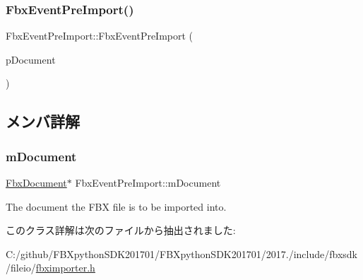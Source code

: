 \subsubsection{\texorpdfstring{Fbx\+Event\+Pre\+Import()}{FbxEventPreImport()}}
{\footnotesize\ttfamily Fbx\+Event\+Pre\+Import\+::\+Fbx\+Event\+Pre\+Import (\begin{DoxyParamCaption}\item[{\hyperlink{class_fbx_document}{Fbx\+Document} $\ast$}]{p\+Document }\end{DoxyParamCaption})}



\subsection{メンバ詳解}
\mbox{\label{class_fbx_event_pre_import_a89b454dc61f00b64cc8a8f951e5e1003}} 
\subsubsection{\texorpdfstring{m\+Document}{mDocument}}
{\footnotesize\ttfamily \hyperlink{class_fbx_document}{Fbx\+Document}$\ast$ Fbx\+Event\+Pre\+Import\+::m\+Document}



The document the F\+BX file is to be imported into. 



このクラス詳解は次のファイルから抽出されました\+:\begin{DoxyCompactItemize}
\item 
C\+:/github/\+F\+B\+Xpython\+S\+D\+K201701/\+F\+B\+Xpython\+S\+D\+K201701/2017./include/fbxsdk/fileio/\hyperlink{fbximporter_8h}{fbximporter.\+h}\end{DoxyCompactItemize}
